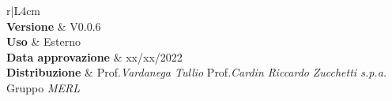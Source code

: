 \begin{center}
	\begin{tabular}{r|L{4cm}}
			 \\
			\hline
			\textbf{Versione}			& V0.0.6 \\
			\textbf{Uso}		& Esterno \\
			\textbf{Data approvazione} 			& xx/xx/2022 \\
			\textbf{Distribuzione} 	&	Prof.\textit{Vardanega Tullio} \newline Prof.\textit{Cardin Riccardo} \newline \textit{Zucchetti s.p.a.} \newline Gruppo \textit{MERL} \\
	\end{tabular}
\end{center}
